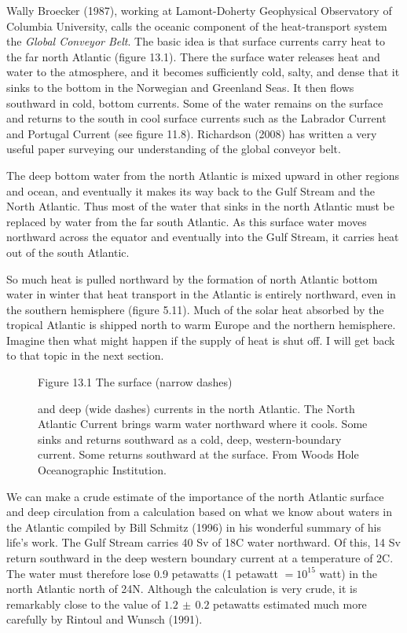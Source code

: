 Wally Broecker (1987), working at Lamont-Doherty Geophysical Observatory of Columbia University, calls the oceanic component of the heat-transport system the \textit{Global Conveyor Belt}. The basic idea is that surface currents carry heat to the far north Atlantic (figure 13.1). There the surface water releases heat and water to the atmosphere, and it becomes sufficiently cold, salty, and dense that it sinks to the bottom in the Norwegian and Greenland Seas. It then flows southward in cold, bottom currents. Some of the water remains on the surface and returns to the south in cool surface currents such as the Labrador Current and Portugal Current (see figure 11.8). Richardson (2008) has written a very useful paper surveying our understanding of the global conveyor belt.

The deep bottom water from the north Atlantic is mixed upward in
other regions and ocean, and eventually it makes its way back to the Gulf Stream and the North
Atlantic. Thus most of the water that sinks in the north Atlantic must be replaced by water from the far south Atlantic. As this surface water moves northward across the equator and eventually into the Gulf Stream, it carries heat out of the south Atlantic. 

So much heat is pulled northward by the formation of north Atlantic bottom water in winter that heat transport in the Atlantic is entirely northward, even in the southern hemisphere (figure 5.11). Much of the solar heat absorbed by the tropical Atlantic is shipped north to warm Europe and the northern hemisphere. Imagine then what might happen if the supply of heat is shut off. I will get back to that topic in the next section.

\begin{figure}[t!]
\footnotesize
Figure 13.1 The surface (narrow dashes) \rule{0mm}{3ex}and deep (wide dashes) currents
in the north Atlantic. The North Atlantic Current brings warm water northward where it cools.
Some sinks and returns southward as a cold, deep, western-boundary current. Some returns
southward at the surface. From Woods Hole Oceanographic Institution.
\label{fig:fig13-1}
\vspace{-4ex}
\end{figure}

We can make a crude estimate of the importance of the north Atlantic surface and deep
circulation from a calculation based on what we know about waters in the Atlantic
compiled by Bill Schmitz (1996) in his wonderful summary of his life's work. The
Gulf Stream carries 40 Sv of
18\degrees C water northward. Of this, 14 Sv return southward in the deep western boundary
current at a temperature of 2\degrees C. The water must therefore lose 0.9 petawatts (1
petawatt $= 10^{15}
$ watt) in the north Atlantic north of 24\degrees N. Although the calculation is very crude,
it is remarkably close to the value of
$1.2\,\pm\,0.2$ petawatts estimated much more carefully by Rintoul and Wunsch
(1991).


